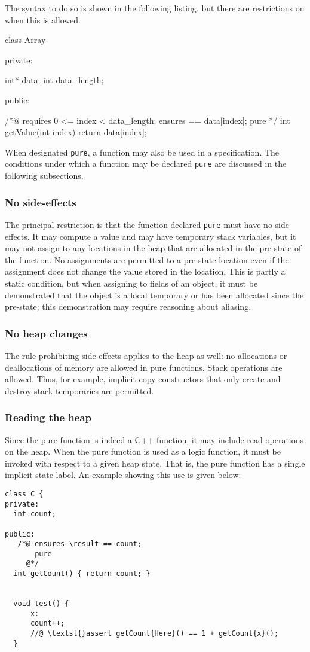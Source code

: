 The syntax to do so is shown in the following listing, but there are restrictions on when this is allowed.

\begin{listing-nonumber}
class Array {
	
  private:
	
    int* data;
    int data_length;
	
  public:
	
    /*@ 
      requires 0 <= index < data_length;
      ensures \result == data[index];
      pure
    */
    int getValue(int index) {
		return data[index];
    }	
}
\end{listing-nonumber}

When designated \lstinline|pure|, a \lang{} function may also be used in a \NAME{} specification. The conditions under which a 
\lang{} function may be declared \lstinline|pure| are discussed in the following subsections.

\subsubsection{No side-effects}
The principal restriction is that the function declared \lstinline|pure| must have no side-effects. It may compute a value and may have 
temporary stack variables, but it may not assign to any locations in the heap that are allocated in the pre-state of the function.
No assignments are permitted to a pre-state location even if the assignment does not change the value stored in the location.
This is partly a static condition, but when assigning to fields of an object, it must be demonstrated that the object is a local temporary or
has been allocated since the pre-state; this demonstration may require reasoning about aliasing.

\subsubsection{No heap changes}
The rule prohibiting side-effects applies to the heap as well:
no allocations or deallocations of memory are allowed in pure functions.
Stack operations are allowed. Thus, for example,
 implicit copy constructors that 
only create and destroy stack temporaries are permitted.

\subsubsection*{Reading the heap}
Since the pure function is indeed a C++ function, it may include read operations on the heap. When the pure function is used as a logic function,
it must be invoked with respect to a given heap state. 
That is, the pure function has a single implicit state label.
An example showing this use is given below:
\begin{lstlisting}
class C {
private:
  int count;

public:
   /*@ ensures \result == count;
       pure
     @*/   
  int getCount() { return count; }
  
  
  void test() {
      x:
      count++;
      //@ \textsl{}assert getCount{Here}() == 1 + getCount{x}();
  }

\end{lstlisting}

